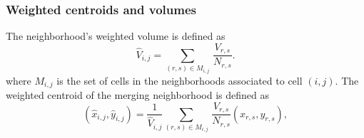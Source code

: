 %


\subsubsection*{Weighted centroids and volumes}

The neighborhood's weighted volume is defined as
\begin{equation}
\label{eqn:voldef}
{\widehat V}_{i,j} =  \sum_{(r,s) \in M_{i,j} } \,  \frac{V_{r,s}}{N_{r,s}}.
\end{equation}
where $M_{i,j}$ is the set of cells in the neighborhoods associated to cell $(i,j)$. 
The weighted centroid of the merging neighborhood is defined as
\begin{equation}
\label{eqn:centroiddef}
({\widehat x}_{i,j},{\widehat y}_{i,j}) = \frac{1}{\widehat V_{i,j}} \sum_{(r,s) \in M_{i,j} } \,  \frac{V_{r,s}}{N_{r,s}}(x_{r,s},y_{r,s}),
\end{equation}

